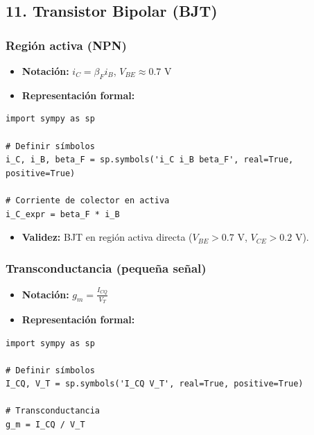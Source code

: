 \documentclass[11pt,a4paper]{article}
\begin{document}
\subsection*{11. Transistor Bipolar (BJT)}


\subsubsection*{Región activa (NPN)}


\begin{itemize}[leftmargin=*,topsep=2pt,itemsep=1pt]
  \item \textbf{Notación:} $i_C = \beta_F i_B$, $V_{BE} \approx 0.7\text{ V}$
  \item \textbf{Representación formal:}
\end{itemize}


\begin{lstlisting}
import sympy as sp

# Definir símbolos
i_C, i_B, beta_F = sp.symbols('i_C i_B beta_F', real=True, positive=True)

# Corriente de colector en activa
i_C_expr = beta_F * i_B
\end{lstlisting}


\begin{itemize}[leftmargin=*,topsep=2pt,itemsep=1pt]
  \item \textbf{Validez:} BJT en región activa directa ($V_{BE} > 0.7\text{ V}$, $V_{CE} > 0.2\text{ V}$).
\end{itemize}


\subsubsection*{Transconductancia (pequeña señal)}


\begin{itemize}[leftmargin=*,topsep=2pt,itemsep=1pt]
  \item \textbf{Notación:} $g_m = \frac{I_{CQ}}{V_T}$
  \item \textbf{Representación formal:}
\end{itemize}


\begin{lstlisting}
import sympy as sp

# Definir símbolos
I_CQ, V_T = sp.symbols('I_CQ V_T', real=True, positive=True)

# Transconductancia
g_m = I_CQ / V_T
\end{lstlisting}
\end{document}
